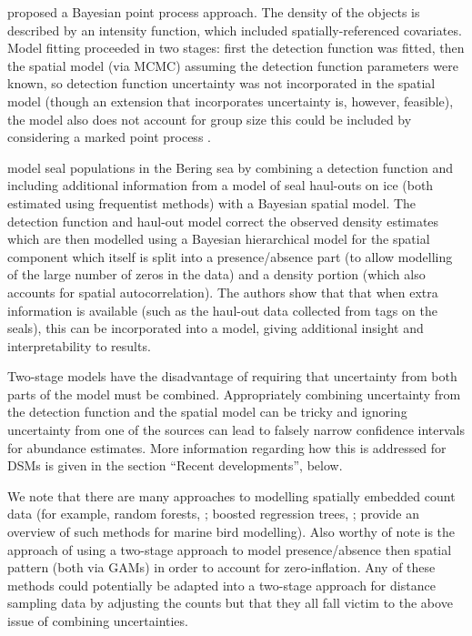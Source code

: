 \documentclass[a4paper,12pt]{article}
\begin{document}
\cite{Niemi:2010kx} proposed a Bayesian point process approach. The density of the objects is described by an intensity function, which included spatially-referenced covariates. Model fitting proceeded in two stages: first the detection function was fitted, then the spatial model (via MCMC) assuming the detection function parameters were known, so detection function uncertainty was not incorporated in the spatial model (though an extension that incorporates uncertainty is, however, feasible), the model also does not account for group size this could be included by considering a marked point process \citep[Section 5.5]{cox1980point}.

\cite{VerHoef:2013ky} model seal populations in the Bering sea by combining a detection function and including additional information from a model of seal haul-outs on ice (both estimated using frequentist methods) with a Bayesian spatial model. The detection function and haul-out model correct the observed density estimates which are then modelled using a Bayesian hierarchical model for the spatial component which itself is split into a presence/absence part (to allow modelling of the large number of zeros in the data) and a density portion (which also accounts for spatial autocorrelation). The authors show that that when extra information is available (such as the haul-out data collected from tags on the seals), this can be incorporated into a model, giving additional insight and interpretability to results.

Two-stage models have the disadvantage of requiring that uncertainty from both parts of the model must be combined. Appropriately combining uncertainty from the detection function and the spatial model can be tricky and ignoring uncertainty from one of the sources can lead to falsely narrow confidence intervals for abundance estimates. More information regarding how this is addressed for DSMs is given in the section ``Recent developments'', below.

We note that there are many approaches to modelling spatially embedded count data (for example, random forests, \cite{Breiman:2001wf}; boosted regression trees, \cite{Friedman:2002um}; \cite{Oppel:2011tv} provide an overview of such methods for marine bird modelling). Also worthy of note is the approach of \cite{Barry:2002bm} using a two-stage approach to model presence/absence then spatial pattern (both via GAMs) in order to account for zero-inflation. Any of these methods could potentially be adapted into a two-stage approach for distance sampling data by adjusting the counts but that they all fall victim to the above issue of combining uncertainties.
\end{document}
